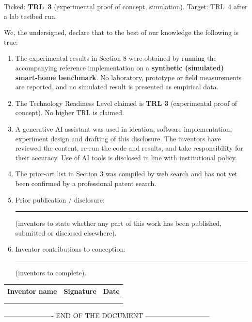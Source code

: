 \documentclass[10pt,a4paper]{article}
\newcommand{\sect}[1]{\par\vspace{5pt}{\bfseries\large #1}\par\vspace{1pt}}
\begin{document}
Ticked: \textbf{TRL~3} (experimental proof of concept, simulation). Target: TRL~4 after a lab testbed run.


\sect{Declaration of Technical Integrity and IP Origin}
We, the undersigned, declare that to the best of our knowledge the following is true:
\begin{enumerate}[leftmargin=*,itemsep=2pt]
\item The experimental results in Section 8 were obtained by running the accompanying reference implementation on a \textbf{synthetic (simulated) smart-home benchmark}. No laboratory, prototype or field measurements are reported, and no simulated result is presented as empirical data.
\item The Technology Readiness Level claimed is \textbf{TRL 3} (experimental proof of concept). No higher TRL is claimed.
\item A generative AI assistant was used in ideation, software implementation, experiment design and drafting of this disclosure. The inventors have reviewed the content, re-run the code and results, and take responsibility for their accuracy. Use of AI tools is disclosed in line with institutional policy.
\item The prior-art list in Section 3 was compiled by web search and has not yet been confirmed by a professional patent search.
\item Prior publication / disclosure: \rule{6cm}{0.4pt} (inventors to state whether any part of this work has been published, submitted or disclosed elsewhere).
\item Inventor contributions to conception: \rule{6cm}{0.4pt} (inventors to complete).
\end{enumerate}
\vspace{8pt}
\begin{tabular}{@{}p{6.5cm}p{6.5cm}p{3.5cm}@{}}
\toprule Inventor name & Signature & Date\\ \midrule
\rule{0pt}{18pt} & & \\ \rule{0pt}{18pt} & & \\ \bottomrule
\end{tabular}

\begin{center}\footnotesize ---------------------- END OF THE DOCUMENT -----------------------------\end{center}
\end{document}
